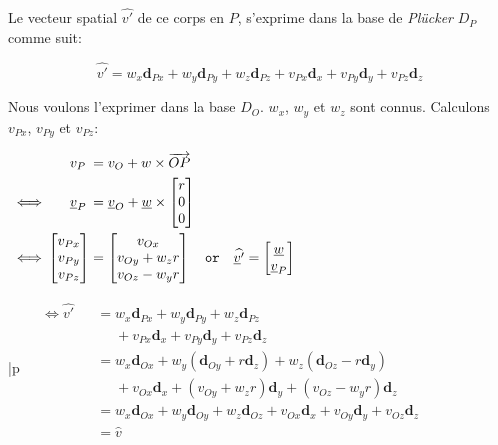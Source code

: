 Le vecteur spatial $\widehat{v'}$ de ce corps en $P$, s'exprime dans la base de \emph{Plücker} $D_{P}$ comme suit:

\begin{equation*}
  \widehat{v'} = w_{x}\textbf{d}_{Px} + w_{y}\textbf{d}_{Py} + w_{z}\textbf{d}_{Pz} + v_{Px}\textbf{d}_{x} + v_{Py}\textbf{d}_{y} + v_{Pz}\textbf{d}_{z}
\end{equation*}

Nous voulons l'exprimer dans la base $D_{O}$. $w_{x}$, $w_{y}$ et $w_{z}$ sont connus. Calculons $v_{Px}$, $v_{Py}$ et $v_{Pz}$:

\vspace{0.3cm}
{%
\(
\begin{alignedat}{3}
  & &&\phantom{xxx} v_{P} &&= v_{O} + w \times \overrightarrow{OP} \\
  \vspace{0.5cm}
  &\iff &&\phantom{xxx} \underline{v}_{P}
  &&=
  \underline{v}_{O}+\underline{w}\times
  \begin{bmatrix}
    r\\
    0\\
    0
  \end{bmatrix} \\
  \vspace{0.5cm}
  &\iff
  &&\begin{bmatrix}
    v_{Px} \\
    v_{Py} \\
    v_{Pz}
  \end{bmatrix}
  &&=
  \begin{bmatrix}
    v_{Ox}\\
    v_{Oy}+w_{z}r\\
    v_{Oz}-w_{y}r
  \end{bmatrix}
  \quad \texttt{or} \quad
  \widehat{\underline{v}'}
  =
  \begin{bmatrix}
    \underline{w} \\
    \underline{v}_{P}
  \end{bmatrix}
\end{alignedat}
\)}
{%
\begin{tabular}{|p{\textwidth}}
\(\begin{alignedat}{2}
  &\iff
  \widehat{v'} &&= w_{x}\textbf{d}_{Px} + w_{y}\textbf{d}_{Py} + w_{z}\textbf{d}_{Pz} \\
  &            &&\phantom{{}={}} + v_{Px}\textbf{d}_{x} + v_{Py}\textbf{d}_{y} + v_{Pz}\textbf{d}_{z} \\
  &            &&= w_{x}\textbf{d}_{Ox} + w_{y}(\textbf{d}_{Oy}+r\textbf{d}_{z}) + w_{z}(\textbf{d}_{Oz}-r\textbf{d}_{y}) \\
  &            &&\phantom{{}={}} + v_{Ox}\textbf{d}_{x} + (v_{Oy}+w_{z}r)\textbf{d}_{y} + (v_{Oz}-w_{y}r)\textbf{d}_{z} \\
  &            &&= w_{x}\textbf{d}_{Ox} + w_{y}\textbf{d}_{Oy} + w_{z}\textbf{d}_{Oz} + v_{Ox}\textbf{d}_{x} + v_{Oy}\textbf{d}_{y} + v_{Oz}\textbf{d}_{z} \\
  &            &&= \widehat{v}
\end{alignedat}\)
\end{tabular}
}
{}
\vspace{0.3cm}

